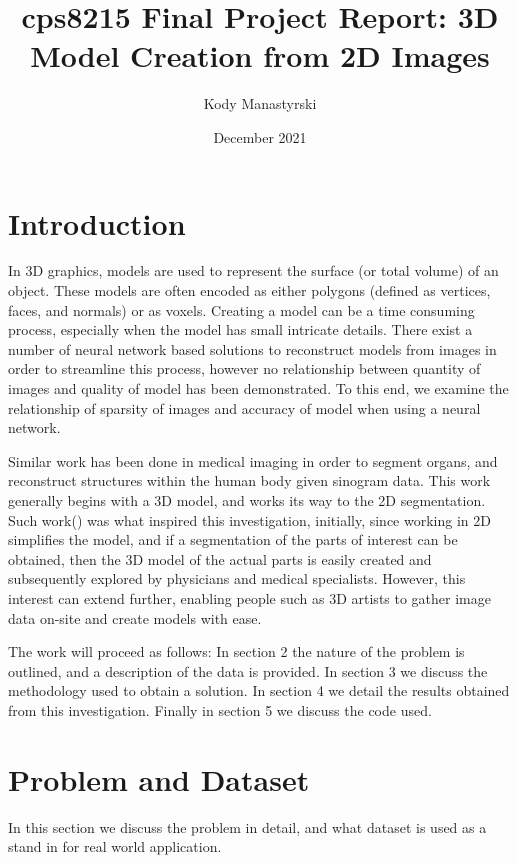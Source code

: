\documentclass{article}
\author{Kody Manastyrski}
\title{cps8215 Final Project Report: 3D Model Creation from 2D Images}
\date{December 2021}
\begin{document}
\maketitle
\section{Introduction}

In 3D graphics, models are used to represent the surface (or total volume) of an
object. 
These models are often encoded as either polygons (defined as vertices,
faces, and normals) or as voxels. 
Creating a model can be a time consuming process, especially when the model has
small intricate details.
There exist a number of neural network based solutions to reconstruct models from
images in order to streamline this process, however no relationship between
quantity of images and quality of model has been demonstrated. 
To this end, we examine the relationship of sparsity of images and accuracy of
model when using a neural network. 

Similar work has been done in medical imaging in order to segment organs, and 
reconstruct structures within the human body given sinogram data. 
This work generally begins with a 3D model, and works its way to the 2D 
segmentation. 
Such work(\cite{Angermann2019}) was what inspired this investigation, initially, since working in 2D
simplifies the model, and if a segmentation of the parts of interest can be 
obtained, then the 3D model of the actual parts is easily created and 
subsequently explored by physicians and medical specialists. 
However, this interest can extend further, enabling people such as 3D artists to
gather image data on-site and create models with ease. 

The work will proceed as follows: In section 2 the nature of the problem is 
outlined, and a description of the data is provided. 
In section 3 we discuss the methodology used to obtain a solution.
In section 4 we detail the results obtained from this investigation.
Finally in section 5 we discuss the code used.

\section{Problem and Dataset}
In this section we discuss the problem in detail, and what dataset is used as a
stand in for real world application.
\end{document}
